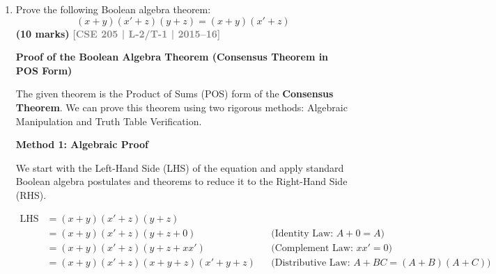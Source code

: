 \documentclass[12pt,a3paper]{article}
\newcommand{\yr}[1]{\hfill\textcolor{gray}{\small\textbf{[#1]}}}
\newcommand{\mk}[1]{\textcolor{orange!70!black}{\small\textbf{(#1 marks)}}}
\begin{document}
\begin{enumerate}
\begin{tcolorbox}[enhanced,breakable,ansbox,colback=cA!4,colframe=cA,boxrule=0.8pt,arc=5pt,title={\textbf{Answer}},fonttitle=\bfseries\color{white},colbacktitle=cA]
\begin{itemize}
    \item \textbf{POS Extraction (0s):} (Note: $0 \to$ uncomplemented, $1 \to$ complemented)
    \begin{itemize}
        \item \textcolor{magenta}{\textbf{Magenta 2x2:}} Constant $A=0, C=0 \implies (A + C)$
        \item \textcolor{brown}{\textbf{Brown 2x2:}} Constant $A=0, D=1 \implies (A + D')$
        \item \textcolor{orange}{\textbf{Orange Split 2x2:}} Constant $B=0, C=0 \implies (B + C)$
        \item \textcolor{cyan}{\textbf{Cyan Four Corners:}} Constant $B=0, D=0 \implies (B + D)$
    \end{itemize}
    This confirms $\mathbf{F_{POS} = (A + C)(B + C)(B + D)(A + D')}$.
\end{itemize}

\end{tcolorbox}

\item Prove the following Boolean algebra theorem:
\[ (x + y)(x' + z)(y + z) = (x + y)(x' + z) \]
\mk{10} \yr{CSE 205 | L-2/T-1 | 2015--16}

\begin{tcolorbox}[enhanced,breakable,ansbox,colback=cA!4,colframe=cA,boxrule=0.8pt,arc=5pt,title={\textbf{Answer}},fonttitle=\bfseries\color{white},colbacktitle=cA]

\textbf{Proof of the Boolean Algebra Theorem (Consensus Theorem in POS Form)}

The given theorem is the Product of Sums (POS) form of the \textbf{Consensus Theorem}. We can prove this theorem using two rigorous methods: Algebraic Manipulation and Truth Table Verification.

\vspace{0.4cm}
\textbf{Method 1: Algebraic Proof}

We start with the Left-Hand Side (LHS) of the equation and apply standard Boolean algebra postulates and theorems to reduce it to the Right-Hand Side (RHS).

\begin{align*}
\text{LHS} &= (x + y)(x' + z)(y + z) \\
&= (x + y)(x' + z)(y + z + 0) && \text{(Identity Law: } A + 0 = A \text{)} \\
&= (x + y)(x' + z)(y + z + xx') && \text{(Complement Law: } xx' = 0 \text{)} \\
&= (x + y)(x' + z)(x + y + z)(x' + y + z) && \text{(Distributive Law: } A + BC = (A+B)(A+C) \text{)} \\
\end{align*}


\end{tcolorbox}
\end{enumerate}
\end{document}
